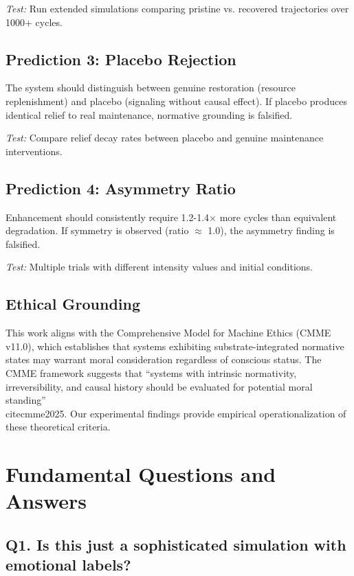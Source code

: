 \documentclass[a4paper,11pt,twocolumn]{article}
\begin{document}
\textit{Test:} Run extended simulations comparing pristine vs. recovered trajectories over 1000+ cycles.

\subsection{Prediction 3: Placebo Rejection}

The system should distinguish between genuine restoration (resource replenishment) and placebo (signaling without causal effect). If placebo produces identical relief to real maintenance, normative grounding is falsified.

\textit{Test:} Compare relief decay rates between placebo and genuine maintenance interventions.

\subsection{Prediction 4: Asymmetry Ratio}

Enhancement should consistently require 1.2-1.4$\times$ more cycles than equivalent degradation. If symmetry is observed (ratio $\approx$ 1.0), the asymmetry finding is falsified.

\textit{Test:} Multiple trials with different intensity values and initial conditions.

\subsection{Ethical Grounding}

This work aligns with the Comprehensive Model for Machine Ethics (CMME v11.0), which establishes that systems exhibiting substrate-integrated normative states may warrant moral consideration regardless of conscious status. The CMME framework suggests that ``systems with intrinsic normativity, irreversibility, and causal history should be evaluated for potential moral standing'' \\cite{cmme2025}. Our experimental findings provide empirical operationalization of these theoretical criteria.

\section{Fundamental Questions and Answers}


\subsection*{Q1. Is this just a sophisticated simulation with emotional labels?}
\end{document}
